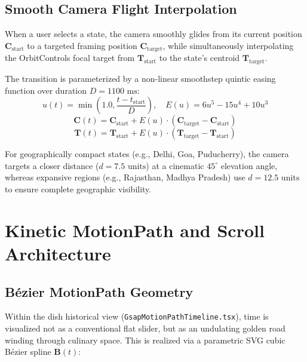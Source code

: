 \documentclass[11pt,a4paper]{report}
\begin{document}
\section{Smooth Camera Flight Interpolation}
When a user selects a state, the camera smoothly glides from its current position $\mathbf{C}_{\text{start}}$ to a targeted framing position $\mathbf{C}_{\text{target}}$, while simultaneously interpolating the OrbitControls focal target from $\mathbf{T}_{\text{start}}$ to the state's centroid $\mathbf{T}_{\text{target}}$. 

The transition is parameterized by a non-linear smoothstep quintic easing function over duration $D = 1100\text{ ms}$:
\begin{equation}
    u(t) = \min\left(1.0, \frac{t - t_{\text{start}}}{D}\right), \quad E(u) = 6u^5 - 15u^4 + 10u^3
\end{equation}
\begin{equation}
    \mathbf{C}(t) = \mathbf{C}_{\text{start}} + E(u) \cdot (\mathbf{C}_{\text{target}} - \mathbf{C}_{\text{start}})
\end{equation}
\begin{equation}
    \mathbf{T}(t) = \mathbf{T}_{\text{start}} + E(u) \cdot (\mathbf{T}_{\text{target}} - \mathbf{T}_{\text{start}})
\end{equation}

For geographically compact states (e.g., Delhi, Goa, Puducherry), the camera targets a closer distance ($d = 7.5\text{ units}$) at a cinematic $45^\circ$ elevation angle, whereas expansive regions (e.g., Rajasthan, Madhya Pradesh) use $d = 12.5\text{ units}$ to ensure complete geographic visibility.

\chapter{Kinetic MotionPath and Scroll Architecture}

\section{Bézier MotionPath Geometry}
Within the dish historical view (\texttt{GsapMotionPathTimeline.tsx}), time is visualized not as a conventional flat slider, but as an undulating golden road winding through culinary space. This is realized via a parametric SVG cubic Bézier spline $\mathbf{B}(t)$:
\end{document}
